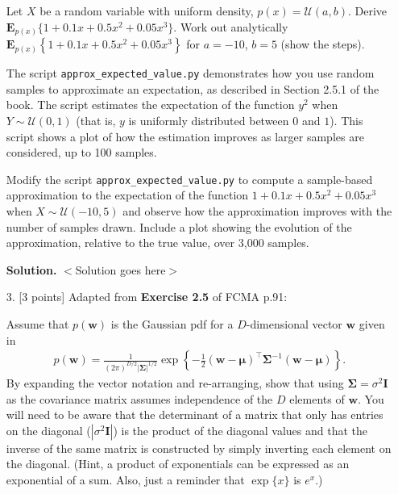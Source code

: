 \documentclass[10pt]{article}
\begin{document}
\begin{itemize}
Let $X$ be a random variable with uniform density, $p(x) = \mathcal{U}(a,b)$.  Derive $\mathbf{E}_{p(x)} \{ 1 + 0.1x + 0.5x^2 + 0.05x^3 \}$.  Work out analytically $\mathbf{E}_{p(x)} \left\{ 1 + 0.1x + 0.5x^2 + 0.05x^3 \right\}$ for $a=-10$, $b=5$ (show the steps).  

The script {\tt approx\_expected\_value.py} demonstrates how you use random samples to approximate an expectation, as described in Section 2.5.1 of the book.  The script estimates the expectation of the function $y^2$ when $Y \sim \mathcal{U}(0,1)$ (that is, $y$ is uniformly distributed between $0$ and $1$).  This script shows a plot of how the estimation improves as larger samples are considered, up to 100 samples.

Modify the script {\tt approx\_expected\_value.py} to compute a sample-based approximation to the expectation of the function $1 + 0.1x + 0.5x^2 + 0.05x^3$ when $X \sim \mathcal{U}(-10,5)$ and observe how the approximation improves with the number of samples drawn.  Include a plot showing the evolution of the approximation, relative to the true value, over 3,000 samples.

{\bf Solution.} $<$Solution goes here$>$

%
%



\item[3.] [3 points]
Adapted from {\bf Exercise 2.5} of FCMA p.91:

Assume that $p(\mathbf{w})$ is the Gaussian pdf for a $D$-dimensional vector $\mathbf{w}$ given in
\begin{eqnarray*}
p(\mathbf{w}) = \frac{1}{(2 \pi)^{D/2} | \mathbf{\Sigma} |^{1/2}} \exp \left\{ -\frac{1}{2} (\mathbf{w} - \mathbf{\mu})^\top \mathbf{\Sigma}^{-1} (\mathbf{w} - \mathbf{\mu}) \right\} .
\end{eqnarray*}
By expanding the vector notation and re-arranging, show that using $\mathbf{\Sigma} = \sigma^2 \mathbf{I}$ as the covariance matrix assumes independence of the $D$ elements of $\mathbf{w}$.  You will need to be aware that the determinant of a matrix that only has entries on the diagonal ($|\sigma^2 \mathbf{I}|$) is the product of the diagonal values and that the inverse of the same matrix is constructed by simply inverting each element on the diagonal.  (Hint, a product of exponentials can be expressed as an exponential of a sum.  Also, just a reminder that $\exp\{x\}$ is $e^x$.)


\end{itemize}
\end{document}
